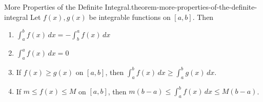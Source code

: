 \documentclass[10pt,]{book}
\numberwithin{equation}{section}
\begin{document}
\begin{theorem}{More Properties of the Definite Integral.}{}{theorem-more-properties-of-the-definite-integral}%
\hypertarget{p-442}{}%
Let \(f(x),g(x)\) be integrable functions on \([a,b]\). Then \leavevmode%
\begin{enumerate}
\item\hypertarget{li-36}{}\(\int_{a}^{b}f(x)\,dx = - \int_{b}^{a}f(x)\,dx\)%
\item\hypertarget{li-37}{}\(\int_{a}^{a}f(x)\,dx = 0\)%
\item\hypertarget{li-38}{}If \(f(x)\geq g(x)\) on \([a,b]\), then \(\int_{a}^{b}f(x)\,dx \geq \int_{a}^{b}g(x)\,dx\).%
\item\hypertarget{li-39}{}If \(m\leq f(x)\leq M\) on \([a,b]\), then \(m(b-a)\leq \int_{a}^{b}f(x)\,dx\leq M(b-a)\).%
\end{enumerate}
%
\end{theorem}
%
%
\typeout{************************************************}
\typeout{************************************************}
%
\end{document}
